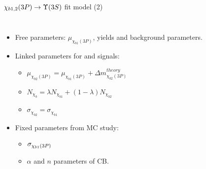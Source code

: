 \begin{frame}{$\chi_{b1,2}(3P) \to \ThreeS$ fit model (2)}
\begin{columns}[T]
\begin{itemize}
\item Free parameters: $\mu_{\chi_{b1}(3P)}$, yields and background parameters.
\item Linked parameters for \chibone and \chibtwo signals:
    \begin{itemize}
    \item $\mu_{\chi_{b2}(3P)} = \mu_{\chi_{b1}(3P)} + \Delta m_{\chi_{b2}(3P)}^{theory}$
    \item $N_{\chi_{b}} = \lambda N_{\chi_{b1}} + (1-\lambda) N_{\chi_{b2}}$
    \item $\sigma_{\chi_{b2}} = \sigma_{\chi_{b1}}$
    \end{itemize}

\item Fixed parameters from MC study:
    \begin{itemize}
    \item $\sigma_{\chi_{b 1}(3P)}$
    \item $\alpha$ and $n$ parameters of CB.
    \end{itemize}
\end{itemize}
\end{columns}
\end{frame}
